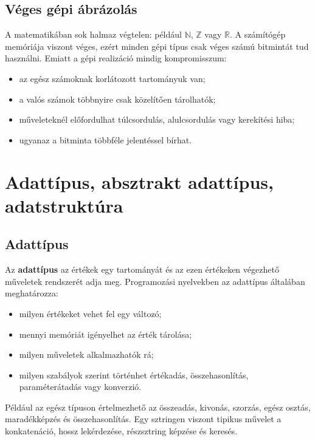 \subsection{Véges gépi ábrázolás}

A matematikában sok halmaz végtelen: például $\mathbb{N}$, $\mathbb{Z}$ vagy $\mathbb{R}$. A számítógép memóriája viszont véges, ezért minden gépi típus csak véges számú bitmintát tud használni. Emiatt a gépi realizáció mindig kompromisszum:

\begin{itemize}
  \item az egész számoknak korlátozott tartományuk van;
  \item a valós számok többnyire csak közelítően tárolhatók;
  \item műveleteknél előfordulhat túlcsordulás, alulcsordulás vagy kerekítési hiba;
  \item ugyanaz a bitminta többféle jelentéssel bírhat.
\end{itemize}

\section{Adattípus, absztrakt adattípus, adatstruktúra}

\subsection{Adattípus}

Az \textbf{adattípus} az értékek egy tartományát és az ezen értékeken végezhető műveletek rendszerét adja meg. Programozási nyelvekben az adattípus általában meghatározza:

\begin{itemize}
  \item milyen értékeket vehet fel egy változó;
  \item mennyi memóriát igényelhet az érték tárolása;
  \item milyen műveletek alkalmazhatók rá;
  \item milyen szabályok szerint történhet értékadás, összehasonlítás, paraméterátadás vagy konverzió.
\end{itemize}

Például az egész típuson értelmezhető az összeadás, kivonás, szorzás, egész osztás, maradékképzés és összehasonlítás. Egy sztringen viszont tipikus művelet a konkatenáció, hossz lekérdezése, részsztring képzése és keresés.

